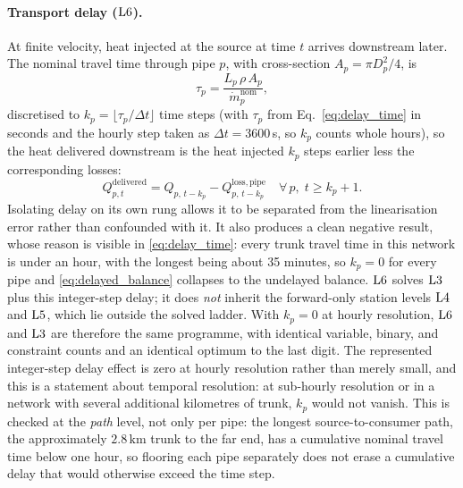 \paragraph{Transport delay ($\mathrm{L6}$).}
At finite velocity, heat injected at the source at time $t$ arrives downstream later. The
nominal travel time through pipe $p$, with cross-section $A_p = \pi D_p^2/4$, is
%
\begin{equation}
  \tau_p = \frac{L_p\, \rho\, A_p}{\dot{m}_p^{\mathrm{nom}}},
  \label{eq:delay_time}
\end{equation}
%
discretised to $k_p = \lfloor \tau_p/\Delta t \rfloor$ time steps (with $\tau_p$ from
Eq.~\eqref{eq:delay_time} in seconds and the hourly step taken as $\Delta t = 3600$\,s, so
$k_p$ counts whole hours), so the heat delivered downstream is the heat injected $k_p$ steps
earlier less the corresponding losses:
%
\begin{equation}
  Q_{p,t}^{\mathrm{delivered}} =
    Q_{p,\,t-k_p} - Q_{p,\,t-k_p}^{\mathrm{loss,pipe}}
  \quad \forall\, p,\; t \geq k_p{+}1.
  \label{eq:delayed_balance}
\end{equation}
%
Isolating delay on its own rung allows it to be separated from the linearisation error rather 
than confounded with it. It also produces a clean negative result, whose reason is visible 
in \eqref{eq:delay_time}: every trunk travel time in this network is under an hour, with 
the longest being about 35 minutes, so \(k_p=0\) for every pipe and \eqref{eq:delayed_balance} 
collapses to the undelayed balance. \(\mathrm{L6}\) solves \(\mathrm{L3}\) plus this integer-step delay; 
it does \emph{not} inherit the forward-only station levels \(\mathrm{L4}\) and \(\mathrm{L5}\), which 
lie outside the solved ladder. With \(k_p=0\) at hourly resolution, \(\mathrm{L6}\) and \(\mathrm{L3}\) 
are therefore the same programme, with identical variable, binary, and constraint counts and 
an identical optimum to the last digit. The represented integer-step delay effect is zero at 
hourly resolution rather than merely small, and this is a statement about temporal resolution: 
at sub-hourly resolution or in a network with several additional kilometres of trunk, \(k_p\) 
would not vanish. This is checked at the \emph{path} level, not only per pipe: the longest 
source-to-consumer path, the approximately \(2.8\,\mathrm{km}\) trunk to the far end, has a 
cumulative nominal travel time below one hour, so flooring each pipe separately does not 
erase a cumulative delay that would otherwise exceed the time step.